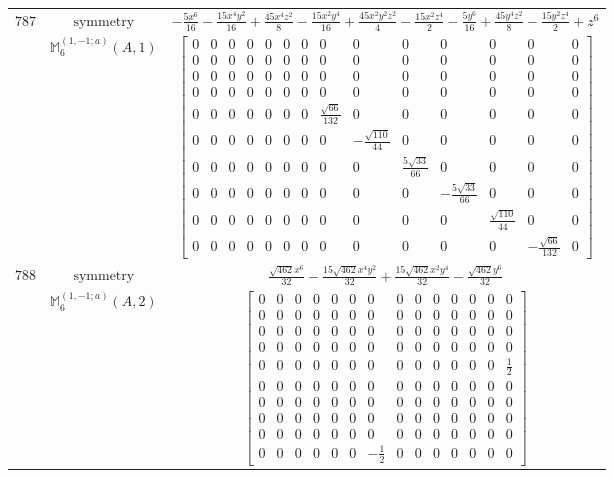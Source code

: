 \documentclass[fleqn,8pt,landscape]{jsarticle}
\begin{document}
\begin{longtable}{ccc}
$ 787 $ & $ \text{symmetry} $ & $ - \frac{5 x^{6}}{16} - \frac{15 x^{4} y^{2}}{16} + \frac{45 x^{4} z^{2}}{8} - \frac{15 x^{2} y^{4}}{16} + \frac{45 x^{2} y^{2} z^{2}}{4} - \frac{15 x^{2} z^{4}}{2} - \frac{5 y^{6}}{16} + \frac{45 y^{4} z^{2}}{8} - \frac{15 y^{2} z^{4}}{2} + z^{6} $ \\
$  $ & $ \mathbb{M}_{6}^{(1,-1;a)}(A,1) $ & $ \begin{bmatrix} 0 & 0 & 0 & 0 & 0 & 0 & 0 & 0 & 0 & 0 & 0 & 0 & 0 & 0 \\ 0 & 0 & 0 & 0 & 0 & 0 & 0 & 0 & 0 & 0 & 0 & 0 & 0 & 0 \\ 0 & 0 & 0 & 0 & 0 & 0 & 0 & 0 & 0 & 0 & 0 & 0 & 0 & 0 \\ 0 & 0 & 0 & 0 & 0 & 0 & 0 & 0 & 0 & 0 & 0 & 0 & 0 & 0 \\ 0 & 0 & 0 & 0 & 0 & 0 & 0 & \frac{\sqrt{66}}{132} & 0 & 0 & 0 & 0 & 0 & 0 \\ 0 & 0 & 0 & 0 & 0 & 0 & 0 & 0 & - \frac{\sqrt{110}}{44} & 0 & 0 & 0 & 0 & 0 \\ 0 & 0 & 0 & 0 & 0 & 0 & 0 & 0 & 0 & \frac{5 \sqrt{33}}{66} & 0 & 0 & 0 & 0 \\ 0 & 0 & 0 & 0 & 0 & 0 & 0 & 0 & 0 & 0 & - \frac{5 \sqrt{33}}{66} & 0 & 0 & 0 \\ 0 & 0 & 0 & 0 & 0 & 0 & 0 & 0 & 0 & 0 & 0 & \frac{\sqrt{110}}{44} & 0 & 0 \\ 0 & 0 & 0 & 0 & 0 & 0 & 0 & 0 & 0 & 0 & 0 & 0 & - \frac{\sqrt{66}}{132} & 0 \end{bmatrix} $ \\ \hline
$ 788 $ & $ \text{symmetry} $ & $ \frac{\sqrt{462} x^{6}}{32} - \frac{15 \sqrt{462} x^{4} y^{2}}{32} + \frac{15 \sqrt{462} x^{2} y^{4}}{32} - \frac{\sqrt{462} y^{6}}{32} $ \\
$  $ & $ \mathbb{M}_{6}^{(1,-1;a)}(A,2) $ & $ \begin{bmatrix} 0 & 0 & 0 & 0 & 0 & 0 & 0 & 0 & 0 & 0 & 0 & 0 & 0 & 0 \\ 0 & 0 & 0 & 0 & 0 & 0 & 0 & 0 & 0 & 0 & 0 & 0 & 0 & 0 \\ 0 & 0 & 0 & 0 & 0 & 0 & 0 & 0 & 0 & 0 & 0 & 0 & 0 & 0 \\ 0 & 0 & 0 & 0 & 0 & 0 & 0 & 0 & 0 & 0 & 0 & 0 & 0 & 0 \\ 0 & 0 & 0 & 0 & 0 & 0 & 0 & 0 & 0 & 0 & 0 & 0 & 0 & \frac{1}{2} \\ 0 & 0 & 0 & 0 & 0 & 0 & 0 & 0 & 0 & 0 & 0 & 0 & 0 & 0 \\ 0 & 0 & 0 & 0 & 0 & 0 & 0 & 0 & 0 & 0 & 0 & 0 & 0 & 0 \\ 0 & 0 & 0 & 0 & 0 & 0 & 0 & 0 & 0 & 0 & 0 & 0 & 0 & 0 \\ 0 & 0 & 0 & 0 & 0 & 0 & 0 & 0 & 0 & 0 & 0 & 0 & 0 & 0 \\ 0 & 0 & 0 & 0 & 0 & 0 & - \frac{1}{2} & 0 & 0 & 0 & 0 & 0 & 0 & 0 \end{bmatrix} $ \\ \hline

\end{longtable}
\end{document}

